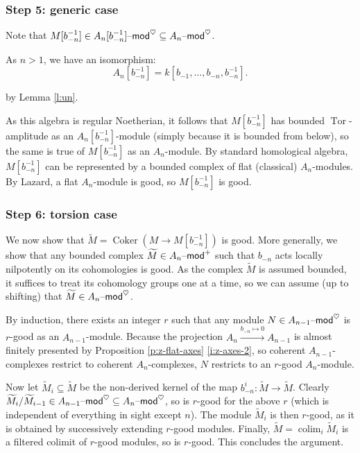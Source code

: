 \documentclass[reqno,11pt]{amsart}
\numberwithin{equation}{subsection}
\theoremstyle{remark}
\newcommand{\xar}[1]{\xrightarrow{#1}}
\newcommand{\on}{\operatorname}
\newcommand{\mathendash}{\text{\textendash}}
\newcommand{\Coker}{\on{Coker}}
\newcommand{\Tor}{\on{Tor}}
\renewcommand{\mod}{\mathendash\mathsf{mod}}
\newcommand{\colim}{\on{colim}}
\newcommand{\heart}{\heartsuit}
\renewcommand{\subset}{\subseteq}
\begin{document}
\subsubsection{Step 5: generic case}

Note that $M[b_{-n}^{-1}] \in A_n[b_{-n}^{-1}]\mod^{\heart} \subset A_n\mod^{\heart}$.

As $n>1$, we have an isomorphism:
%
\[
A_n[b_{-n}^{-1}] = k[b_{-1},\ldots,b_{-n},b_{-n}^{-1}].
\]

\noindent by Lemma \ref{l:un}.

As this algebra is regular Noetherian, it follows that
$M[b_{-n}^{-1}]$ has bounded $\Tor$-amplitude as an 
$A_n[b_{-n}^{-1}]$-module (simply because it is bounded from below),
so the same is true of $M[b_{-n}^{-1}]$ as an $A_n$-module.
By standard homological algebra, $M[b_{-n}^{-1}]$ can be represented
by a bounded complex of flat (classical) $A_n$-modules. 
By Lazard, a flat $A_n$-module is good, so $M[b_{-n}^{-1}]$ is good.

\subsubsection{Step 6: torsion case} 

We now show that $\widetilde{M} = \Coker(M \to M[b_{-n}^{-1}])$ is good. 
More generally, we show that any bounded complex 
$\widetilde{M} \in A_n\mod^+$ such that $b_{-n}$ acts locally nilpotently on
its cohomologies is good. As the complex $\widetilde{M}$ is assumed bounded,
it suffices to treat its cohomology groups one at a time, so 
we can assume (up to shifting) that $\widetilde{M} \in A_n\mod^{\heart}$.

By induction, there exists an integer $r$ such that any module
$N \in A_{n-1}\mod^{\heart}$ is $r$-good as an $A_{n-1}$-module.
Because the projection $A_n \xar{b_{-n} \mapsto 0} A_{n-1}$ is
almost finitely presented by Proposition \ref{p:z-flat-axes} \eqref{i:z-axes-2},
so coherent $A_{n-1}$-complexes restrict to coherent $A_n$-complexes, 
$N$ restricts to an $r$-good $A_n$-module. 

Now let $\widetilde{M}_i \subset \widetilde{M}$ be the 
non-derived kernel of the map $b_{-n}^i:\widetilde{M} \to \widetilde{M}$. 
Clearly $\widetilde{M}_i/\widetilde{M}_{i-1} \in A_{n-1}\mod^{\heart} \subset
A_n\mod^{\heart}$, so is $r$-good for the above $r$ (which is independent
of everything in sight except $n$). The module 
$\widetilde{M}_i$ is then $r$-good, as it is obtained by successively extending
$r$-good modules. Finally, $\widetilde{M} = \colim_i \widetilde{M}_i$ is 
a filtered colimit of $r$-good modules, so is $r$-good. This concludes the argument.
\end{document}
